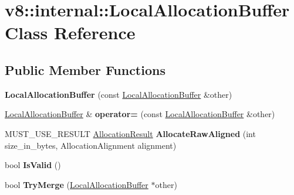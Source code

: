 \hypertarget{classv8_1_1internal_1_1_local_allocation_buffer}{}\section{v8\+:\+:internal\+:\+:Local\+Allocation\+Buffer Class Reference}
\label{classv8_1_1internal_1_1_local_allocation_buffer}
\subsection*{Public Member Functions}
\begin{DoxyCompactItemize}
\item 
{\bfseries Local\+Allocation\+Buffer} (const \hyperlink{classv8_1_1internal_1_1_local_allocation_buffer}{Local\+Allocation\+Buffer} \&other)\hypertarget{classv8_1_1internal_1_1_local_allocation_buffer_a5aee20bc9f715301f971efdb2a806ef8}{}\label{classv8_1_1internal_1_1_local_allocation_buffer_a5aee20bc9f715301f971efdb2a806ef8}

\item 
\hyperlink{classv8_1_1internal_1_1_local_allocation_buffer}{Local\+Allocation\+Buffer} \& {\bfseries operator=} (const \hyperlink{classv8_1_1internal_1_1_local_allocation_buffer}{Local\+Allocation\+Buffer} \&other)\hypertarget{classv8_1_1internal_1_1_local_allocation_buffer_a134eeb076046e18a302914be634e5b6f}{}\label{classv8_1_1internal_1_1_local_allocation_buffer_a134eeb076046e18a302914be634e5b6f}

\item 
M\+U\+S\+T\+\_\+\+U\+S\+E\+\_\+\+R\+E\+S\+U\+LT \hyperlink{classv8_1_1internal_1_1_allocation_result}{Allocation\+Result} {\bfseries Allocate\+Raw\+Aligned} (int size\+\_\+in\+\_\+bytes, Allocation\+Alignment alignment)\hypertarget{classv8_1_1internal_1_1_local_allocation_buffer_a0031615ada2211c96e55950f47546512}{}\label{classv8_1_1internal_1_1_local_allocation_buffer_a0031615ada2211c96e55950f47546512}

\item 
bool {\bfseries Is\+Valid} ()\hypertarget{classv8_1_1internal_1_1_local_allocation_buffer_a0f679269a19bb2906f2faa291110c743}{}\label{classv8_1_1internal_1_1_local_allocation_buffer_a0f679269a19bb2906f2faa291110c743}

\item 
bool {\bfseries Try\+Merge} (\hyperlink{classv8_1_1internal_1_1_local_allocation_buffer}{Local\+Allocation\+Buffer} $\ast$other)\hypertarget{classv8_1_1internal_1_1_local_allocation_buffer_a18e56358625b165ec26a23d5b583c424}{}\label{classv8_1_1internal_1_1_local_allocation_buffer_a18e56358625b165ec26a23d5b583c424}

\end{DoxyCompactItemize}
